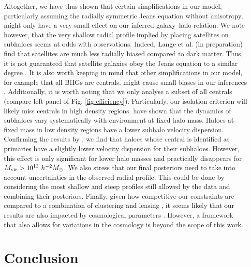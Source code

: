 \documentclass[fleqn,usenatbib,useAMS]{mnras}
\begin{document}
	Altogether, we have thus shown that certain simplifications in our model, particularly assuming the radially symmetric Jeans equation without anisotropy, might only have a very small effect on our inferred galaxy--halo relation. We note however, that the very shallow radial profile implied by placing satellites on subhaloes seems at odds with observations. Indeed, Lange et al. (in preparation) find that satellites are much less radially biased compared to dark matter. Thus, it is not guaranteed that satellite galaxies obey the Jeans equation to a similar degree \citep[see also][]{Ye+17}. It is also worth keeping in mind that other simplifications in our model, for example that all BHGs are centrals, might cause small biases in our inferences \citep{Lange+18a}. Additionally, it is worth noting that we only analyse a subset of all centrals (compare left panel of Fig. \ref{fig:efficiency}). Particularly, our isolation criterion will likely miss centrals in high density regions. \cite{Faltenbacher+10} have shown that the dynamics of subhaloes vary systematically with environment at fixed halo mass. Haloes at fixed mass in low density regions have a lower subhalo velocity dispersion. Confirming the results by \cite{Faltenbacher+10}, we find that haloes whose central is identified as primaries have a slightly lower velocity dispersion for their subhaloes. However, this effect is only significant for lower halo masses and practically disappears for $M_{\rm vir} > 10^{13} \ h^{-2} M_\odot$. We also stress that our final posteriors need to take into account uncertainties in the observed radial profile. This could be done by considering the most shallow and steep profiles still allowed by the data and combining their posteriors. Finally, given how competitive our constraints are compared to a combination of clustering and lensing \citep{Cacciato+13}, it seems likely that our results are also impacted by cosmological parameters \citep[see also][]{Li+12}. However, a framework that also allows for variations in the cosmology is beyond the scope of this work.
	
	\section{Conclusion}
	\label{sec:conclusion}
	
\end{document}
